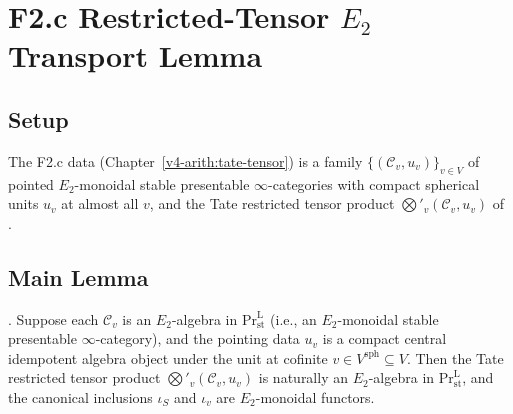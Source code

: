 \section{F2.c Restricted-Tensor \(E_{2}\) Transport Lemma}
\label{v4-arith:w5-h:f2c}

\subsection{Setup}

The F2.c data (Chapter~\ref{v4-arith:tate-tensor}) is a family
\(\{(\mathcal{C}_{v},u_{v})\}_{v\in V}\) of pointed \(E_{2}\)-monoidal
stable presentable \(\infty\)-categories with compact spherical units
\(u_{v}\) at almost all \(v\), and the Tate restricted tensor product
\(\bigotimes'_{v}(\mathcal{C}_{v},u_{v})\) of
.

\subsection{Main Lemma}

\begin{theorem}
\label{v4-arith:w5-h:thm:f2c-e2-transport}
\ClaimStatusProvedHere. Suppose each \(\mathcal{C}_{v}\) is an
\(E_{2}\)-algebra in \(\mathrm{Pr}^{\mathrm{L}}_{\mathrm{st}}\)
(i.e., an \(E_{2}\)-monoidal stable presentable \(\infty\)-category), and
the pointing data \(u_{v}\) is a compact central idempotent algebra
object under the unit at cofinite \(v\in V^{\mathrm{sph}}\subseteq V\).
Then the Tate restricted tensor product
\(\bigotimes'_{v}(\mathcal{C}_{v},u_{v})\) is naturally an
\(E_{2}\)-algebra in \(\mathrm{Pr}^{\mathrm{L}}_{\mathrm{st}}\), and the
canonical inclusions \(\iota_{S}\) and \(\iota_{v}\) are \(E_{2}\)-monoidal
functors.
\end{theorem}

